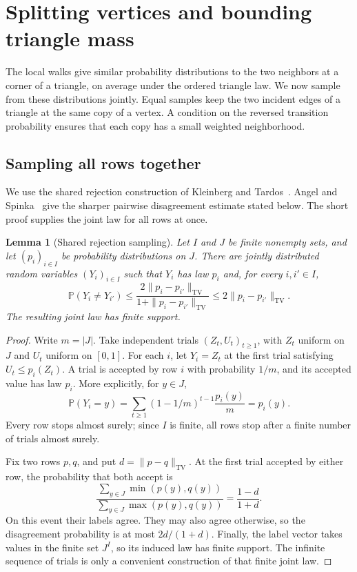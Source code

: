 \documentclass[11pt]{article}
\newtheorem{lemma}[theorem]{Lemma}
\theoremstyle{definition}
\theoremstyle{remark}
\numberwithin{equation}{section}
\begin{document}
\section{Splitting vertices and bounding triangle mass}
\label{sec:splitting}

The local walks give similar probability distributions to the two
neighbors at a corner of a triangle, on average under the ordered
triangle law. We now sample from these distributions jointly.
Equal samples keep the two incident edges of a triangle at the same copy
of a vertex. A condition on the reversed transition probability ensures
that each copy has a small weighted neighborhood.

\subsection{Sampling all rows together}

We use the shared rejection construction of Kleinberg and
Tardos~\cite[Section~3, Lemmas~3.1 and~3.2]{KleinbergTardos2002}.
Angel and Spinka~\cite[Theorem~2 and Section~2.1]{AngelSpinka2021}
give the sharper pairwise disagreement estimate stated below.
The short proof supplies the joint law for all rows at once.

\begin{lemma}[Shared rejection sampling]\label{lem:shared-rejection}
Let $I$ and $J$ be finite nonempty sets, and let $(p_i)_{i\in I}$ be
probability distributions on $J$. There are jointly distributed random
variables $(Y_i)_{i\in I}$ such that $Y_i$ has law $p_i$ and, for every
$i,i'\in I$,
\[
 \mathbb P(Y_i\ne Y_{i'})
 \le \frac{2\|p_i-p_{i'}\|_{\mathrm{TV}}}
 {1+\|p_i-p_{i'}\|_{\mathrm{TV}}}
 \le 2\|p_i-p_{i'}\|_{\mathrm{TV}}.
\]
The resulting joint law has finite support.
\end{lemma}

\begin{proof}
Write $m=|J|$. Take independent trials $(Z_t,U_t)_{t\ge1}$, with $Z_t$
uniform on $J$ and $U_t$ uniform on $[0,1]$. For each $i$, let $Y_i=Z_t$
at the first trial satisfying $U_t\le p_i(Z_t)$. A trial is accepted
by row $i$ with probability $1/m$, and its accepted value has law $p_i$.
More explicitly, for $y\in J$,
\[
 \mathbb P(Y_i=y)
 =\sum_{t\ge1}(1-1/m)^{t-1}\frac{p_i(y)}m=p_i(y).
\]
Every row stops almost surely; since $I$ is finite, all rows stop after
a finite number of trials almost surely.

Fix two rows $p,q$, and put $d=\|p-q\|_{\mathrm{TV}}$. At the first
trial accepted by either row, the probability that both accept is
\[
 \frac{\sum_{y\in J}\min(p(y),q(y))}
 {\sum_{y\in J}\max(p(y),q(y))}
 =\frac{1-d}{1+d}.
\]
On this event their labels agree. They may also agree otherwise, so
the disagreement probability is at most $2d/(1+d)$. Finally, the label
vector takes values in the finite set $J^I$, so its induced law has
finite support. The infinite sequence of trials is only a convenient
construction of that finite joint law.
\end{proof}
\end{document}
